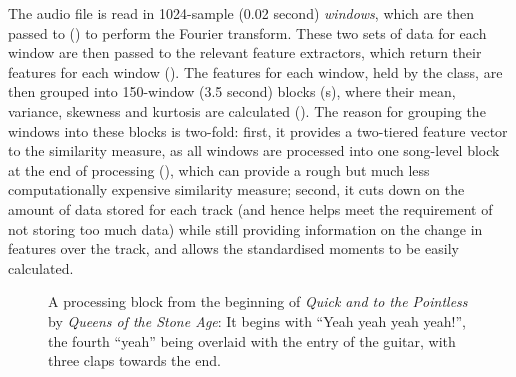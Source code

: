 The audio file is read in 1024-sample (0.02 second) \emph{windows}, which are then passed to  () to perform the Fourier transform. These two sets of data for each window are then passed to the relevant feature extractors, which return their features for each window (). The features for each window, held by the  class, are then grouped into 150-window (3.5 second) blocks (s), where their mean, variance, skewness and kurtosis are calculated (). The reason for grouping the windows into these blocks is two-fold: first, it provides a two-tiered feature vector to the similarity measure, as all windows are processed into one song-level block at the end of processing (), which can provide a rough but much less computationally expensive similarity measure; second, it cuts down on the amount of data stored for each track (and hence helps meet the requirement of not storing too much data) while still providing information on the change in features over the track, and allows the standardised moments to be easily calculated.
\begin{figure}[h]
	\centering
	\caption{A processing block from the beginning of \emph{Quick and to the Pointless} by \emph{Queens of the Stone Age}: It begins with ``Yeah yeah yeah yeah!'', the fourth ``yeah'' being overlaid with the entry of the guitar, with three claps towards the end.}
	\label{fig:method:block}
\end{figure}
